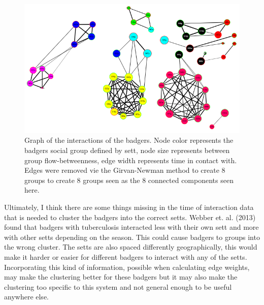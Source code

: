 \documentclass{sig-alternate-05-2015}
\begin{document}
\begin{figure}[h]
\includegraphics[width=\linewidth]{raw-8.PNG}
\caption{Graph of the interactions of the badgers.  Node color represents the badgers social group defined by sett, node size represents between group flow-betweenness, edge width represents time in contact with.  Edges were removed vie the Girvan-Newman method to create 8 groups to create 8 groups seen as the 8 connected components seen here.} %
\label{raw-8} %
\end{figure}

\indent Ultimately, I think there are some things missing in the time of interaction data that is needed to cluster the badgers into the correct setts.  Webber et. al. (2013) found that badgers with tuberculosis interacted less with their own sett and more with other setts depending on the season.  This could cause badgers to groups into the wrong cluster.  The setts are also spaced differently geographically, this would make it harder or easier for different badgers to interact with any of the setts.  Incorporating this kind of information, possible when calculating edge weights, may make the clustering better for these badgers but it may also make the clustering too specific to this system and not general enough to be useful anywhere else.





\end{document}
